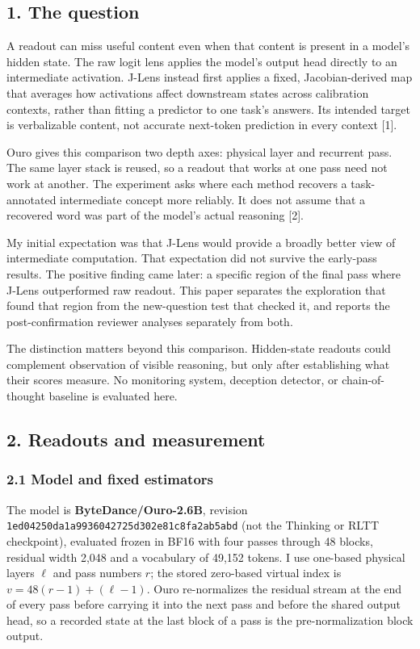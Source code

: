 \documentclass[
  british,
  11pt,
  a4paper,
]{article}
\begin{document}
\subsection{1. The question}\label{the-question}

A readout can miss useful content even when that content is present in a
model's hidden state. The raw logit lens applies the model's output head
directly to an intermediate activation. J-Lens instead first applies a
fixed, Jacobian-derived map that averages how activations affect
downstream states across calibration contexts, rather than fitting a
predictor to one task's answers. Its intended target is verbalizable
content, not accurate next-token prediction in every context {[}1{]}.

Ouro gives this comparison two depth axes: physical layer and recurrent
pass. The same layer stack is reused, so a readout that works at one
pass need not work at another. The experiment asks where each method
recovers a task-annotated intermediate concept more reliably. It does
not assume that a recovered word was part of the model's actual
reasoning {[}2{]}.

My initial expectation was that J-Lens would provide a broadly better
view of intermediate computation. That expectation did not survive the
early-pass results. The positive finding came later: a specific region
of the final pass where J-Lens outperformed raw readout. This paper
separates the exploration that found that region from the new-question
test that checked it, and reports the post-confirmation reviewer
analyses separately from both.

The distinction matters beyond this comparison. Hidden-state readouts
could complement observation of visible reasoning, but only after
establishing what their scores measure. No monitoring system, deception
detector, or chain-of-thought baseline is evaluated here.

\subsection{2. Readouts and measurement}\label{readouts-and-measurement}

\subsubsection{2.1 Model and fixed
estimators}\label{model-and-fixed-estimators}

The model is \textbf{ByteDance/Ouro-2.6B}, revision
\texttt{1ed04250da1a9936042725d302e81c8fa2ab5abd} (not the Thinking or
RLTT checkpoint), evaluated frozen in BF16 with four passes through 48
blocks, residual width 2,048 and a vocabulary of 49,152 tokens. I use
one-based physical layers \(\ell\) and pass numbers \(r\); the stored
zero-based virtual index is \(v = 48(r-1) + (\ell-1)\). Ouro
re-normalizes the residual stream at the end of every pass before
carrying it into the next pass and before the shared output head, so a
recorded state at the last block of a pass is the pre-normalization
block output.
\end{document}

